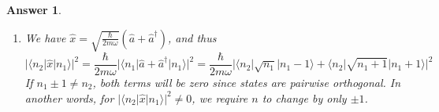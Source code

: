 \documentclass[a4paper]{article}
\newtheorem{ans}{Answer}[subsection]
\theoremstyle{new}
\begin{document}
\begin{ans}
\begin{enumerate}[label=(\alph*)]
which gives us the ground state $$|0\rangle=A_0 e^{-m\omega x^2/2\hbar}$$ for some normalization constant $A_0$. We obtain the first excited state by acting $\hat{a}^\dag$ on the ground state $|0\rangle$.
$$\sqrt{1}|1\rangle=\hat{a}^\dag|0\rangle=A_0\bigg(\sqrt{\frac{m\omega}{2\hbar}}\hat{x}-i\frac{1}{\sqrt{2m\hbar\omega}}\hat{p}\bigg)e^{-m\omega x^2/2\hbar}=A_0e^{-\frac{m\omega x^2}{2\hbar}}\bigg(\sqrt{\frac{m\omega}{2\hbar}}x-\frac{\hbar}{\sqrt{2m\hbar\omega}}\frac{-m\omega x}{\hbar}\bigg)$$
The first excited state will thus be
$$|1\rangle=A_0\sqrt{\frac{2m\omega}{\hbar}}xe^{-m\omega x^2/2\hbar}$$
To check orthogonality:
$$\langle 1|0\rangle=|A_0|^2\int_{-\infty}^\infty e^{-m\omega x^2/\hbar}\sqrt{\frac{2m\omega}{\hbar}}xdx=0$$
since the integrand is odd and we are integrating over symmetric limits.
\item We have $\hat{x}=\sqrt{\frac{\hbar}{2m\omega}}(\hat{a}+\hat{a}^\dag)$, and thus
$$|\langle n_2|\hat{x}|n_1\rangle|^2=\frac{\hbar}{2m\omega}|\langle n_1|\hat{a}+\hat{a}^\dag|n_1\rangle|^2=\frac{\hbar}{2m\omega}|\langle n_2|\sqrt{n_1}|n_1-1\rangle+\langle n_2|\sqrt{n_1+1}|n_1+1\rangle|^2$$
If $n_1\pm1\neq n_2$, both terms will be zero since states are pairwise orthogonal. In another words, for $|\langle n_2|\hat{x}|n_1\rangle|^2\neq 0$, we require $n$ to change by only $\pm1$.
\end{enumerate}
\end{ans}
\newpage
\end{document}
